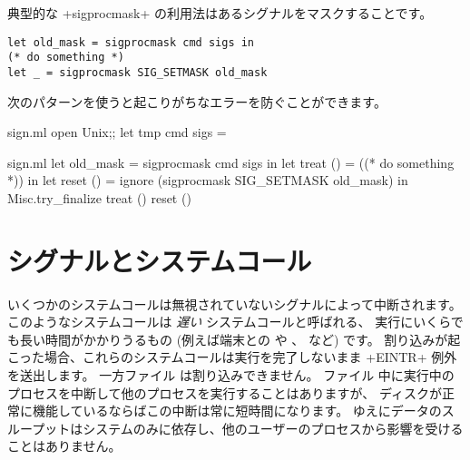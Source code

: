 %
典型的な \ml+sigprocmask+ の利用法はあるシグナルをマスクすることです。
%
\begin{lstlisting}
let old_mask = sigprocmask cmd sigs in
(* do something *)
let _ = sigprocmask SIG_SETMASK old_mask
\end{lstlisting}
%
次のパターンを使うと起こりがちなエラーを防ぐことができます。
%
\begin{codefile}{sign.ml}
open Unix;;
let tmp cmd sigs =
\end{codefile}
%
\begin{listingcodefile}{sign.ml}
let old_mask = sigprocmask cmd sigs in
let treat () = ((* do something *)) in
let reset () = ignore (sigprocmask SIG_SETMASK old_mask) in
Misc.try_finalize treat () reset ()
\end{listingcodefile}

\section{\label{sec/sigsyscalls}シグナルとシステムコール}

いくつかのシステムコールは無視されていないシグナルによって中断されます。
このようなシステムコールは \emph{遅い} システムコールと呼ばれる、
実行にいくらでも長い時間がかかりうるもの (例えば端末との \io や 、  など) です。
割り込みが起こった場合、これらのシステムコールは実行を完了しないまま \ml+EINTR+ 例外を送出します。
一方ファイル \io は割り込みできません。
ファイル \io 中に実行中のプロセスを中断して他のプロセスを実行することはありますが、
ディスクが正常に機能しているならばこの中断は常に短時間になります。
ゆえにデータのスループットはシステムのみに依存し、他のユーザーのプロセスから影響を受けることはありません。


